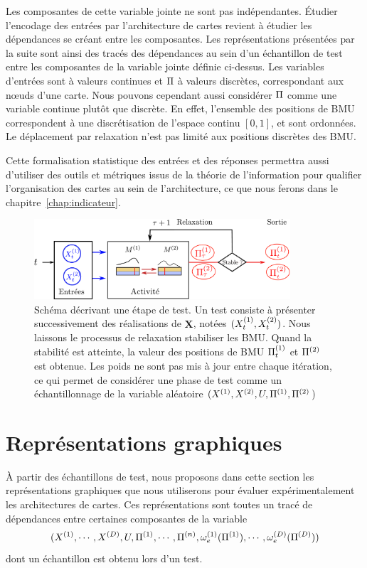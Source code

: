\documentclass[../main]{subfiles}
\begin{document}
Les composantes de cette variable jointe ne sont pas indépendantes. \'Etudier l'encodage des entrées par l'architecture de cartes revient à étudier les dépendances se créant entre les composantes.
Les représentations présentées par la suite sont ainsi des tracés des dépendances au sein d'un échantillon de test entre les composantes de la variable jointe définie ci-dessus.
Les variables d'entrées sont à valeurs continues et $\Pi$ à valeurs discrètes, correspondant aux n\oe{}uds d'une carte.
Nous pouvons cependant aussi considérer $\Pi$ comme une variable continue plutôt que discrète. 
En effet, l'ensemble des positions de BMU correspondent à une discrétisation de l'espace continu $[0,1]$, et sont ordonnées. Le déplacement par relaxation n'est pas limité aux positions discrètes des BMU.

Cette formalisation statistique des entrées et des réponses permettra aussi d'utiliser des outils et métriques issus de la théorie de l'information pour qualifier l'organisation des cartes au sein de l'architecture, ce que nous ferons dans le chapitre~\ref{chap:indicateur}.

\begin{figure}
\centering
\includegraphics[width=0.85\textwidth]{tests_2maps.pdf}
\caption{Schéma décrivant une étape de test. Un test consiste à présenter successivement des réalisations de $\mathbf{X}$, notées $(X^{({1})}_t,X^{({2})}_t)$. Nous laissons le processus de relaxation stabiliser les BMU. Quand la stabilité est atteinte, la valeur des positions de BMU $\Pi^{({1})}_t$ et $\Pi^{({2})}$ est obtenue. Les poids ne sont pas mis à jour entre chaque itération, ce qui permet de considérer une phase de test comme un échantillonnage de la variable aléatoire $(X^{({1})},X^{({2})}, U, \Pi^{({1})}, \Pi^{({2})}$) }
\label{fig:flowchart}
\end{figure}

\section{Représentations graphiques}

\`A partir des échantillons de test, nous proposons dans cette section les représentations graphiques que nous utiliserons pour évaluer expérimentalement les architectures de cartes.
Ces représentations sont toutes un tracé de dépendances entre certaines composantes de la variable $$(X^{({1})}, \cdots, X^{({D})}, U, \Pi^{({1})}, \cdots, \Pi^{({n})}, \omega_e^{({1})}(\Pi^{({1})}), \cdots, \omega_e^{({D})}(\Pi^{({D})}))$$ dont un échantillon est obtenu lors d'un test.
\end{document}
